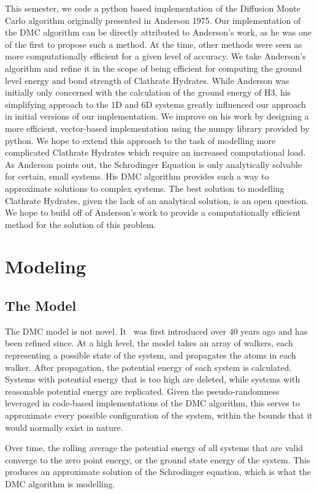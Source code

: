 \documentclass[journal=jacsat,manuscript=article]{achemso}
\begin{document}
This semester, we code a python based implementation of the Diffusion Monte Carlo algorithm originally presented in Anderson 1975. Our implementation of the DMC algorithm can be directly attributed to Anderson's work, as he was one of the first to propose such a method. At the time, other methods were seen as more computationally efficient for a given level of accuracy. We take Anderson's algorithm and refine it in the scope of being efficient for computing the ground level energy and bond strength of Clathrate Hydrates. 
While Anderson was initially only concerned with the calculation of the ground energy of H3, his simplifying approach to the 1D and 6D systems greatly influenced our approach in initial versions of our implementation. We improve on his work by designing a more efficient, vector-based implementation using the numpy library provided by python. We hope to extend this approach to the task of modelling more complicated Clathrate Hydrates which require an increased computational load.
As Anderson points out, the Schrodinger Equation is only analytically solvable for certain, small systems. His DMC algorithm provides such a way to approximate solutions to complex systems. The best solution to modelling Clathrate Hydrates, given the lack of an analytical solution, is an open question. We hope to build off of Anderson's work to provide a computationally efficient method for the solution of this problem.


\section{Modeling}
\subsection{The Model}
The DMC model is not novel. It~\cite{Anderson1975} was first introduced over 40 years ago and has been refined since. At a high level, the model takes an array of walkers, each representing a possible state of the system, and propagates the atoms in each walker. After propagation, the potential energy of each system is calculated. Systems with potential energy that is too high are deleted, while systems with reasonable potential energy are replicated. Given the pseudo-randomness leveraged in code-based implementations of the DMC algorithm, this serves to approximate every possible configuration of the system, within the bounds that it would normally exist in nature.

Over time, the rolling average the potential energy of all systems that are valid converge to the zero point energy, or the ground state energy of the system. This produces an approximate solution of the Schrodinger equation, which is what the DMC algorithm is modelling. 
\end{document}
